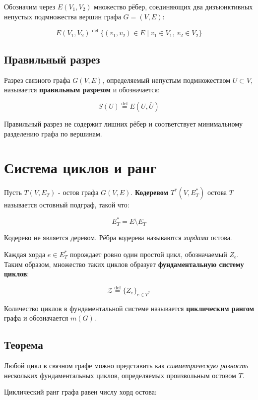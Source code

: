 {Обозначим через $E(V_1, V_2)$ множество рёбер, соединяющих два дизъюнктивных непустых подмножества вершин графа $G = (V, E)$:


\[
E(V_1, V_2) \overset{\text{def}}{=} \{(v_1, v_2) \in E \mid v_1 \in V_1,\ v_2 \in V_2\}
\]



\subsection*{Правильный разрез}

Разрез связного графа $G(V, E)$, определяемый непустым подмножеством $U \subset V$, называется \textbf{правильным разрезом} и обозначается:


\[
S(U) \overset{\text{def}}{=} E(U, \overline{U})
\]



Правильный разрез не содержит лишних рёбер и соответствует минимальному разделению графа по вершинам.

\section*{Система циклов и ранг}

Пусть $T(V, E_T)$ - остов графа $G(V, E)$.  
\textbf{Кодеревом} $T^*(V, E_T^*)$ остова $T$ называется остовный подграф, такой что:


\[
E_T^* = E \setminus E_T
\]


Кодерево не является деревом. Рёбра кодерева называются \emph{хордами} остова.

Каждая хорда $e \in E_T^*$ порождает ровно один простой цикл, обозначаемый $Z_e$.  
Таким образом, множество таких циклов образует \textbf{фундаментальную систему циклов}:


\[
\mathcal{Z} \overset{\text{def}}{=} \{Z_e\}_{e \in T^*}
\]



Количество циклов в фундаментальной системе называется \textbf{циклическим рангом} графа и обозначается $m(G)$.

\subsection*{Теорема}

Любой цикл в связном графе можно представить как \emph{симметрическую разность} нескольких фундаментальных циклов, определяемых произвольным остовом $T$.

Циклический ранг графа равен числу хорд остова:


}
